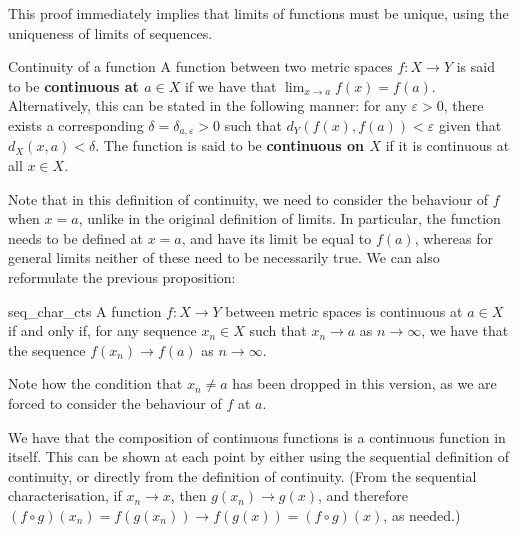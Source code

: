 This proof immediately implies that limits of functions must be unique, using the uniqueness of limits of sequences.

\begin{bdefin}{Continuity of a function}{}
A function between two metric spaces $f : X \to Y$  is said to be \textbf{continuous at $a \in X$} if we have that $\lim_{x \to a} f(x) = f(a)$. Alternatively, this can be stated in the following manner: for any $\varepsilon > 0$, there exists a corresponding $\delta = \delta_{a,\varepsilon} > 0$ such that $d_{Y}( f(x), f(a)) < \varepsilon$ given that $d_{X}(x,a) < \delta$.
The function is said to be \textbf{continuous on $X$} if it is continuous at all $x\in X$. 
\end{bdefin}

Note that in this definition of continuity, we need to consider the behaviour of $f$ when $x=a$, unlike in the original definition of limits. In particular, the function needs to be defined at $x=a$, and have its limit be equal to $f(a)$, whereas for general limits neither of these need to be necessarily true. We can also reformulate the previous proposition:
\begin{bprop}{}{seq_char_cts}
A function $f : X \to Y$ between metric spaces is continuous at $a\in X$ if and only if, for any sequence $x_{n} \in X$ such that $x_{n} \to a$ as $n\to\infty$, we have that the sequence \mbox{$f(x_{n}) \to f(a)$} as $n\to\infty$.
\end{bprop}
Note how the condition that $x_{n} \neq a$ has been dropped in this version, as we are forced to consider the behaviour of $f$ at $a$.

We have that the composition of continuous functions is a continuous function in itself. This can be shown at each point by either using the sequential definition of continuity, or directly from the definition of continuity. (From the sequential characterisation, if $x_{n}\to x$, then $g(x_{n}) \to g(x)$, and therefore $(f\circ g)(x_{n}) = f(g(x_{n})) \to f(g(x)) = (f\circ g)(x)$, as needed.)

